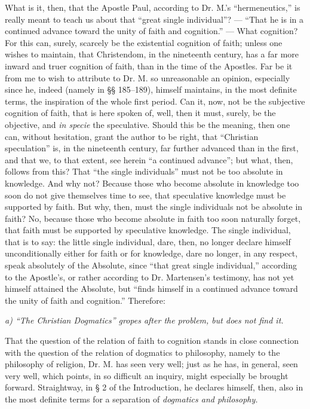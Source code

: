 \documentclass[12pt]{book}
\begin{document}
What is it, then, that the Apostle Paul, according to Dr. M.'s ``hermeneutics,'' is really meant to teach us about that ``great single individual''? --- ``That he is in a continued advance toward the unity of faith and cognition.'' --- What cognition? For this can, surely, scarcely be the existential cognition of faith; unless one wishes to maintain, that Christendom, in the nineteenth century, has a far more inward and truer cognition of faith, than in the time of the Apostles. Far be it from me to wish to attribute to Dr. M. so unreasonable an opinion, especially since he, indeed (namely in §§ 185--189), himself maintains, in the most definite terms, the inspiration of the whole first period. Can it, now, not be the subjective cognition of faith, that is here spoken of, well, then it must, surely, be the objective, and \textit{in specie} the speculative. Should this be the meaning, then one can, without hesitation, grant the author to be right, that ``Christian speculation'' is, in the nineteenth century, far further advanced than in the first, and that we, to that extent, see herein ``a continued advance''; but what, then, follows from this?
That ``the single individuals'' must not be too absolute in knowledge. And why not? Because those who become absolute in knowledge too soon do not give themselves time to see, that speculative knowledge must be supported by faith. But why, then, must the single individuals not be absolute in faith? No, because those who become absolute in faith too soon naturally forget, that faith must be supported by speculative knowledge. The single individual, that is to say: the little single individual, dare, then, no longer declare himself unconditionally either for faith or for knowledge, dare no longer, in any respect, speak absolutely of the Absolute, since ``that great single individual,'' according to the Apostle's, or rather according to Dr. Martensen's testimony, has not yet himself attained the Absolute, but ``finds himself in a continued advance toward the unity of faith and cognition.'' Therefore:

\begin{center}
\emph{a) ``The Christian Dogmatics'' gropes after the problem, but does not find it.}
\end{center}

That the question of the relation of faith to cognition stands in close connection with the question of the relation of dogmatics to philosophy, namely to the philosophy of religion, Dr. M. has seen very well; just as he has, in general, seen very well, which points, in so difficult an inquiry, might especially be brought forward. Straightway, in § 2 of the Introduction, he declares himself, then, also in the most definite terms for a separation of \emph{dogmatics and philosophy.}
\end{document}
